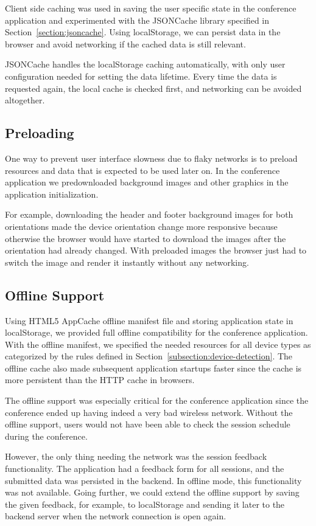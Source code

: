 Client side caching was used in saving the user specific state in the
conference application and experimented with the JSONCache library
specified in Section~\ref{section:jsoncache}. Using localStorage, we
can persist data in the browser and avoid networking if the cached
data is still relevant.

JSONCache handles the localStorage caching automatically, with only
user configuration needed for setting the data lifetime. Every time
the data is requested again, the local cache is checked first, and
networking can be avoided altogether.

\subsection{Preloading}

One way to prevent user interface slowness due to flaky networks is to
preload resources and data that is expected to be used later on. In
the conference application we predownloaded background images and
other graphics in the application initialization.

For example, downloading the header and footer background images for
both orientations made the device orientation change more responsive
because otherwise the browser would have started to download the
images after the orientation had already changed. With preloaded
images the browser just had to switch the image and render it
instantly without any networking.

\subsection{Offline Support}

Using HTML5 AppCache offline manifest file and storing application
state in localStorage, we provided full offline compatibility for the
conference application. With the offline manifest, we specified the
needed resources for all device types as categorized by the rules
defined in Section~\ref{subsection:device-detection}. The offline
cache also made subsequent application startups faster since the cache
is more persistent than the HTTP cache in browsers.

The offline support was especially critical for the conference
application since the conference ended up having indeed a very bad
wireless network.  Without the offline support, users would not have
been able to check the session schedule during the conference.

However, the only thing needing the network was the session feedback
functionality. The application had a feedback form for all sessions,
and the submitted data was persisted in the backend. In offline mode,
this functionality was not available. Going further, we could extend
the offline support by saving the given feedback, for example, to
localStorage and sending it later to the backend server when the
network connection is open again.

